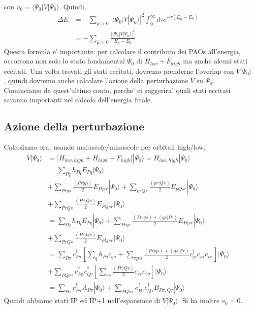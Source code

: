 \documentclass{report}
\begin{document}
con $v_0 = \langle \Psi_0 | V | \Psi_0 \rangle$. Quindi,
\begin{equation}
\begin{split}
\Delta E 
&= - \sum_{\mu > 0} | \langle \Psi_0 | V | \Psi_\mu \rangle |^2 \int_0^\infty d\tau e^{-\tau (E_\mu-E_0)} \\
&= - \sum_{\mu > 0}  \frac{ | \langle \Psi_0 | V | \Psi_\mu \rangle |^2 }{ E_\mu - E_0 } 
\end{split}
\end{equation}
{\color{red}
Questa formula e' importante: per calcolare il contributo dei PAOs all'energia, occorrono non solo lo stato fondamental $\Psi_0$ di $H_{low} + F_{high}$
ma anche alcuni stati eccitati. Una volta trovati gli stati eccitati, dovremo prenderne l'overlap con $V | \Psi_0 \rangle$, quindi dovremo anche calcolare
l'azione della perturbazione $V$ su $\Psi_0$. Cominciamo da quest'ultimo conto, perche' ci suggerira' quali stati eccitati saranno importanti nel calcolo
dell'energia finale.
}

\subsection{Azione della perturbazione} 

Calcoliamo ora, usando maiuscole/minuscole per orbitali high/low,
\begin{equation}
\begin{split}
V | \Psi_0 \rangle 
&= \Big[ H_{low,high} + H_{high} - F_{high} \Big] | \Psi_0 \rangle = H_{low,high} | \Psi_0 \rangle \\
&= \sum_{Pq} h_{Pq} E_{Pq} | \Psi_0 \rangle \\
&+ \sum_{Prqs} \frac{(Pr|qs)}{2} E_{Pqsr} | \Psi_0 \rangle 
+ \sum_{prQs} \frac{(pr|Qs)}{2} E_{pQsr} | \Psi_0 \rangle \\
&+ \sum_{PrQs} \frac{(Pr|Qs)}{2} E_{PQsr} | \Psi_0 \rangle \\
&= \sum_{Pq} h_{Pq} E_{Pq} | \Psi_0 \rangle + \sum_{Prqs} \frac{(Pr|qs)+(qs|Pr)}{2} E_{Pqsr} | \Psi_0 \rangle \\
&+ \sum_{PrQs} \frac{(Pr|Qs)}{2} E_{PQsr} | \Psi_0 \rangle \\
&= \sum_{P\sigma} c^\dagger_{P\sigma} \left[ \sum_{q} h_{Pq} c_{q\sigma} + \sum_{\tau qrs} \frac{(Pr|qs)+(qs|Pr)}{2} c^\dagger_{q\tau} c_{s\tau} c_{r\sigma} \right] | \Psi_0 \rangle \\
&+ \sum_{PQ\sigma\tau} c^\dagger_{P\sigma} c^\dagger_{Q\tau}
\left[ \sum_{rs} \frac{(Pr|Qs)}{2} c_{s\tau} c_{r\sigma} \right] | \Psi_0 \rangle \\
&= \sum_{P\sigma} c^\dagger_{P\sigma} A_{P\sigma} | \Psi_0 \rangle + \sum_{PQ\sigma\tau} c^\dagger_{P\sigma} c^\dagger_{Q\tau} B_{P\sigma,Q\tau} | \Psi_0 \rangle
\end{split}
\end{equation}
Quindi abbiamo stati IP ed IP+1 nell'espansione di $V | \Psi_0 \rangle$. Si ha inoltre $v_0 = 0$.
\end{document}
